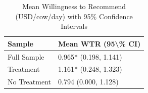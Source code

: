 \begin{table}

\caption{Mean Willingness to Recommend (USD/cow/day) with 95\% Confidence Intervals}
\centering
\begin{tabular}[t]{ll}
\toprule
Sample & Mean WTR (95\textbackslash{}\% CI)\\
\midrule
Full Sample & 0.965* (0.198, 1.141)\\
Treatment & 1.161* (0.248, 1.323)\\
No Treatment & 0.794 (0.000, 1.128)\\
\bottomrule
\end{tabular}
\end{table}
